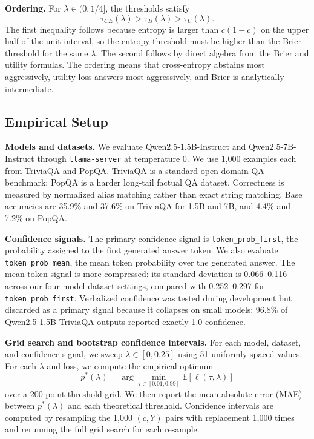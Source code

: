 \documentclass[letterpaper,10pt,twocolumn]{article}
\begin{document}
\textbf{Ordering.}
For $\lambda\in(0,1/4]$, the thresholds satisfy
\begin{equation}
    \tau_{CE}(\lambda)>\tau_B(\lambda)>\tau_U(\lambda).
\end{equation}
The first inequality follows because entropy is larger than $c(1-c)$ on the
upper half of the unit interval, so the entropy threshold must be higher than
the Brier threshold for the same $\lambda$. The second follows by direct
algebra from the Brier and utility formulas. The ordering means that
cross-entropy abstains most aggressively, utility loss answers most
aggressively, and Brier is analytically intermediate.

\subsection{Empirical Setup}

\textbf{Models and datasets.}
We evaluate Qwen2.5-1.5B-Instruct and Qwen2.5-7B-Instruct through
\texttt{llama-server} at temperature $0$. We use 1,000 examples each from
TriviaQA and PopQA. TriviaQA is a standard open-domain QA benchmark; PopQA is
a harder long-tail factual QA dataset. Correctness is measured by normalized
alias matching rather than exact string matching. Base accuracies are
35.9\% and 37.6\% on TriviaQA for 1.5B and 7B, and 4.4\% and 7.2\% on PopQA.

\textbf{Confidence signals.}
The primary confidence signal is \texttt{token\_prob\_first}, the probability
assigned to the first generated answer token. We also evaluate
\texttt{token\_prob\_mean}, the mean token probability over the generated
answer. The mean-token signal is more compressed: its standard deviation is
0.066--0.116 across our four model-dataset settings, compared with
0.252--0.297 for \texttt{token\_prob\_first}. Verbalized confidence was
tested during development but discarded as a primary signal because it
collapses on small models: 96.8\% of Qwen2.5-1.5B TriviaQA outputs reported
exactly 1.0 confidence.

\textbf{Grid search and bootstrap confidence intervals.}
For each model, dataset, and confidence signal, we sweep
$\lambda\in[0,0.25]$ using 51 uniformly spaced values. For each $\lambda$ and
loss, we compute the empirical optimum
\begin{equation}
    p^\ast(\lambda)=\arg\min_{\tau\in[0.01,0.99]}\mathbb{E}[\ell(\tau,\lambda)]
\end{equation}
over a 200-point threshold grid. We then report the mean absolute error
(MAE) between $p^\ast(\lambda)$ and each theoretical threshold. Confidence
intervals are computed by resampling the 1,000 $(c,Y)$ pairs with replacement
1,000 times and rerunning the full grid search for each resample.
\end{document}
